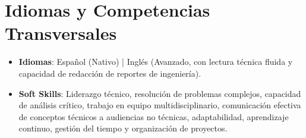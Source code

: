 \documentclass[10pt,letterpaper]{article}
\newcommand{\CVItem}[1]{\item #1}
\begin{document}
\section*{Idiomas y Competencias Transversales}
\begin{itemize}[leftmargin=*, itemsep=0pt]
    \CVItem{\textbf{Idiomas}: Español (Nativo) | Inglés (Avanzado, con lectura técnica fluida y capacidad de redacción de reportes de ingeniería).}
    \CVItem{\textbf{Soft Skills}: Liderazgo técnico, resolución de problemas complejos, capacidad de análisis crítico, trabajo en equipo multidisciplinario, comunicación efectiva de conceptos técnicos a audiencias no técnicas, adaptabilidad, aprendizaje continuo, gestión del tiempo y organización de proyectos.}
\end{itemize}
\end{document}
